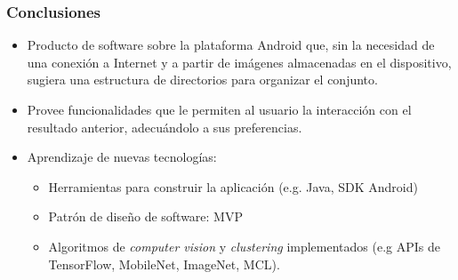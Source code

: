 \begin{frame}[t,fragile]
\frametitle {Conclusiones}

	\begin{itemize}
		\item \small{Producto de software sobre la plataforma Android que, sin la necesidad de una conexión a Internet y a partir de imágenes almacenadas en el dispositivo, sugiera una estructura de directorios para organizar el conjunto.}
		\vspace{3mm}
		\item Provee funcionalidades que le permiten al usuario la interacción con el resultado anterior, adecuándolo a sus preferencias.
		\vspace{3mm}
		\item Aprendizaje de nuevas tecnologías: 
		
		\begin{itemize}
			\item Herramientas para construir la aplicación (e.g. Java, SDK Android)
			
			\item Patrón de diseño de software: MVP
			
			\item Algoritmos de \textit{computer vision} y \textit{clustering} implementados (e.g APIs de TensorFlow, MobileNet, ImageNet, MCL).
		\end{itemize}
		
	\end{itemize}
\end{frame}

